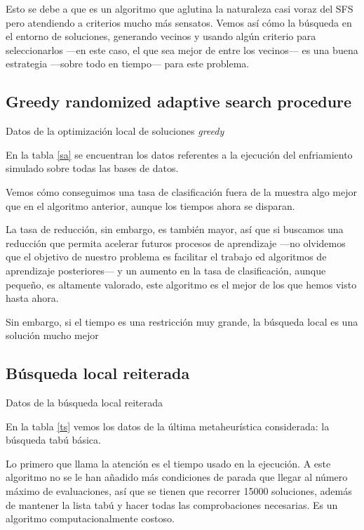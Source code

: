 \documentclass[a4paper, 11pt, titlepage]{article}
\begin{document}
    Esto se debe a que es un algoritmo que aglutina la naturaleza casi voraz del SFS pero atendiendo a criterios mucho más sensatos. Vemos así cómo la búsqueda en el entorno de soluciones, generando vecinos y usando algún criterio para seleccionarlos ---en este caso, el que sea mejor de entre los vecinos--- es una buena estrategia ---sobre todo en tiempo--- para este problema.

    \subsection{Greedy randomized adaptive search procedure}
    \begin{table}[!htb]
        \maketable{\dataGRASP}
        \caption{Datos de la optimización local de soluciones \emph{greedy}}
        \label{sa}
    \end{table}

    En la tabla \ref{sa} se encuentran los datos referentes a la ejecución del enfriamiento simulado sobre todas las bases de datos.

    Vemos cómo conseguimos una tasa de clasificación fuera de la muestra algo mejor que en el algoritmo anterior, aunque los tiempos ahora se disparan.

    La tasa de reducción, sin embargo, es también mayor, así que si buscamos una reducción que permita acelerar futuros procesos de aprendizaje ---no olvidemos que el objetivo de nuestro problema es facilitar el trabajo ed algoritmos de aprendizaje posteriores--- y un aumento en la tasa de clasificación, aunque pequeño, es altamente valorado, este algoritmo es el mejor de los que hemos visto hasta ahora.

    Sin embargo, si el tiempo es una restricción muy grande, la búsqueda local es una solución mucho mejor

    \subsection{Búsqueda local reiterada}
    \begin{table}[!htb]
        \maketable{\dataILS}
        \caption{Datos de la búsqueda local reiterada}
        \label{ts}
    \end{table}

    En la tabla \ref{ts} vemos los datos de la última metaheurística considerada: la búsqueda tabú básica.

    Lo primero que llama la atención es el tiempo usado en la ejecución. A este algoritmo no se le han añadido más condiciones de parada que llegar al número máximo de evaluaciones, así que se tienen que recorrer 15000 soluciones, además de mantener la lista tabú y hacer todas las comprobaciones necesarias. Es un algoritmo computacionalmente costoso.
\end{document}

